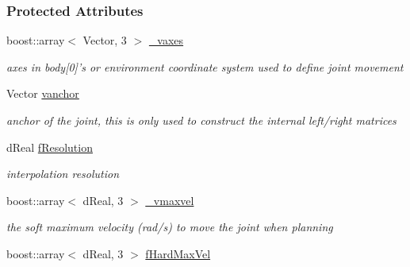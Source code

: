 \subsubsection*{Protected Attributes}
\begin{DoxyCompactItemize}
\item 
\hypertarget{classOpenRAVE_1_1KinBody_1_1Joint_a8f7ce3595b2687565a7fb5d26c4dbef9}{
boost::array$<$ Vector, 3 $>$ \hyperlink{classOpenRAVE_1_1KinBody_1_1Joint_a8f7ce3595b2687565a7fb5d26c4dbef9}{\_\-vaxes}}
\label{classOpenRAVE_1_1KinBody_1_1Joint_a8f7ce3595b2687565a7fb5d26c4dbef9}

\begin{DoxyCompactList}\small\item\em axes in body\mbox{[}0\mbox{]}'s or environment coordinate system used to define joint movement \item\end{DoxyCompactList}\item 
\hypertarget{classOpenRAVE_1_1KinBody_1_1Joint_a64804ea505aa46e8a50d81d31cdb927d}{
Vector \hyperlink{classOpenRAVE_1_1KinBody_1_1Joint_a64804ea505aa46e8a50d81d31cdb927d}{vanchor}}
\label{classOpenRAVE_1_1KinBody_1_1Joint_a64804ea505aa46e8a50d81d31cdb927d}

\begin{DoxyCompactList}\small\item\em anchor of the joint, this is only used to construct the internal left/right matrices \item\end{DoxyCompactList}\item 
\hypertarget{classOpenRAVE_1_1KinBody_1_1Joint_a88c3376752ab869b6ba7ec779e280a3c}{
dReal \hyperlink{classOpenRAVE_1_1KinBody_1_1Joint_a88c3376752ab869b6ba7ec779e280a3c}{fResolution}}
\label{classOpenRAVE_1_1KinBody_1_1Joint_a88c3376752ab869b6ba7ec779e280a3c}

\begin{DoxyCompactList}\small\item\em interpolation resolution \item\end{DoxyCompactList}\item 
\hypertarget{classOpenRAVE_1_1KinBody_1_1Joint_a0803c685cc31b774b49fccebba1345e5}{
boost::array$<$ dReal, 3 $>$ \hyperlink{classOpenRAVE_1_1KinBody_1_1Joint_a0803c685cc31b774b49fccebba1345e5}{\_\-vmaxvel}}
\label{classOpenRAVE_1_1KinBody_1_1Joint_a0803c685cc31b774b49fccebba1345e5}

\begin{DoxyCompactList}\small\item\em the soft maximum velocity (rad/s) to move the joint when planning \item\end{DoxyCompactList}\item 
\hypertarget{classOpenRAVE_1_1KinBody_1_1Joint_a529df46fcfc8448dc4fefbb3ea96ac32}{
boost::array$<$ dReal, 3 $>$ \hyperlink{classOpenRAVE_1_1KinBody_1_1Joint_a529df46fcfc8448dc4fefbb3ea96ac32}{fHardMaxVel}}
\label{classOpenRAVE_1_1KinBody_1_1Joint_a529df46fcfc8448dc4fefbb3ea96ac32}


\end{DoxyCompactItemize}
